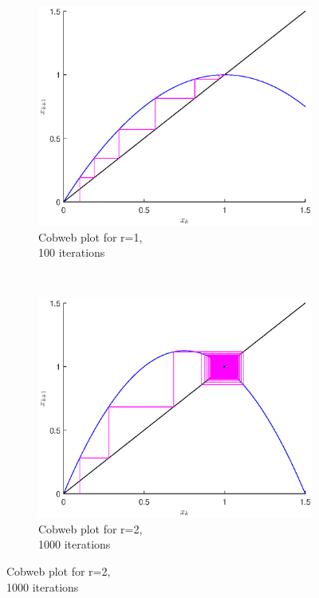 \documentclass[a4paper]{article}
\begin{document}
\begin{figure}
    \centering
    \begin{subfigure}[b]{0.3\textwidth}
        \includegraphics[width=\textwidth]{cobweb1}
        \caption{Cobweb plot for r=1, \\100 iterations}
    \end{subfigure}%
    ~ %
    \begin{subfigure}[b]{0.3\textwidth}
        \includegraphics[width=\textwidth]{cobweb2}
        \caption{Cobweb plot for r=2, \\ 1000 iterations}

\end{subfigure}
\end{figure}
\end{document}
